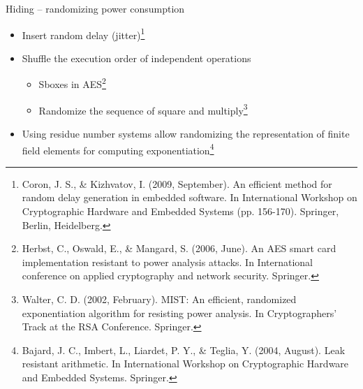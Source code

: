\begin{frame}{Hiding -- randomizing power consumption}
    \begin{itemize}
       \item Insert random delay (jitter)\footnote{Coron, J. S., \& Kizhvatov, I. (2009, September). An efficient method for random delay generation in embedded software. In International Workshop on Cryptographic Hardware and Embedded Systems (pp. 156-170). Springer, Berlin, Heidelberg.}
       \item Shuffle the execution order of independent operations
       \begin{itemize}
           \item Sboxes in AES\footnote{Herbst, C., Oswald, E., \& Mangard, S. (2006, June). An AES smart card implementation resistant to power analysis attacks. In International conference on applied cryptography and network security. Springer.}
           \item Randomize the sequence of square and multiply\footnote{Walter, C. D. (2002, February). MIST: An efficient, randomized exponentiation algorithm for resisting power analysis. In Cryptographers’ Track at the RSA Conference. Springer.}
       \end{itemize}
       \item Using residue number systems allow randomizing the representation of finite field elements for computing exponentiation\footnote{Bajard, J. C., Imbert, L., Liardet, P. Y., \& Teglia, Y. (2004, August). Leak resistant arithmetic. In International Workshop on Cryptographic Hardware and Embedded Systems. Springer.}
    \end{itemize}
\end{frame}

